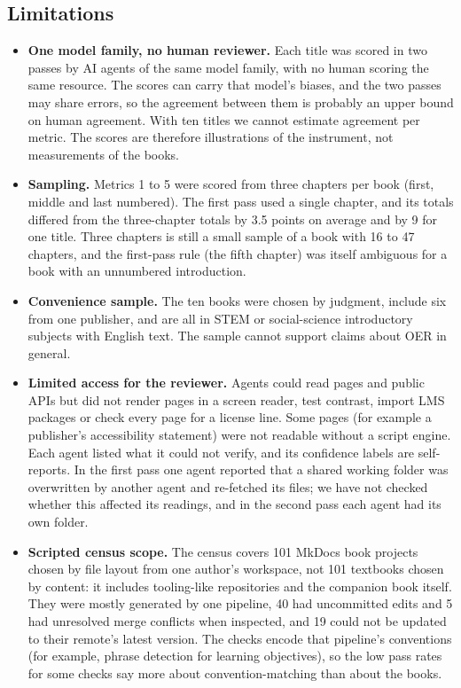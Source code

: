 \subsection{Limitations}
\begin{itemize}[leftmargin=*,itemsep=3pt]
  \item \textbf{One model family, no human reviewer.} Each title was scored in two passes by AI agents of the same model family, with no human scoring the same resource. The scores can carry that model's biases, and the two passes may share errors, so the agreement between them is probably an upper bound on human agreement. With ten titles we cannot estimate agreement per metric. The scores are therefore illustrations of the instrument, not measurements of the books.
  \item \textbf{Sampling.} Metrics 1 to 5 were scored from three chapters per book (first, middle and last numbered). The first pass used a single chapter, and its totals differed from the three-chapter totals by 3.5 points on average and by 9 for one title. Three chapters is still a small sample of a book with 16 to 47 chapters, and the first-pass rule (the fifth chapter) was itself ambiguous for a book with an unnumbered introduction.
  \item \textbf{Convenience sample.} The ten books were chosen by judgment, include six from one publisher, and are all in STEM or social-science introductory subjects with English text. The sample cannot support claims about OER in general.
  \item \textbf{Limited access for the reviewer.} Agents could read pages and public APIs but did not render pages in a screen reader, test contrast, import LMS packages or check every page for a license line. Some pages (for example a publisher's accessibility statement) were not readable without a script engine. Each agent listed what it could not verify, and its confidence labels are self-reports. In the first pass one agent reported that a shared working folder was overwritten by another agent and re-fetched its files; we have not checked whether this affected its readings, and in the second pass each agent had its own folder.
  \item \textbf{Scripted census scope.} The census covers 101 MkDocs book projects chosen by file layout from one author's workspace, not 101 textbooks chosen by content: it includes tooling-like repositories and the companion book itself. They were mostly generated by one pipeline, 40 had uncommitted edits and 5 had unresolved merge conflicts when inspected, and 19 could not be updated to their remote's latest version. The checks encode that pipeline's conventions (for example, phrase detection for learning objectives), so the low pass rates for some checks say more about convention-matching than about the books.

\end{itemize}
